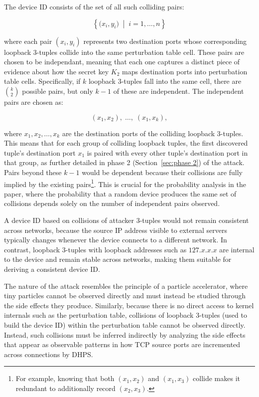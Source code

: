 \documentclass[twocolumn]{report}
\begin{document}
The device ID consists of the set of all such colliding pairs:

\vspace{-0.2cm}
\begin{minipage}{\columnwidth}
	\[
		\left\{ \bigl(x_i, y_i\bigr) \;\middle|\; i = 1, \ldots, n \right\}
	\]
\end{minipage}

where each pair $(x_i, y_i)$ represents \alert{two destination ports} whose corresponding loopback 3-tuples collide into the same perturbation table cell. These pairs are chosen to be \alert{\hypertarget{independant}{independant}}, meaning that each one captures a distinct piece of evidence about how the secret key $K_2$ maps destination ports into perturbation table cells. Specifically, if $k$ loopback 3-tuples fall into the same cell, there are $\binom{k}{2}$ possible pairs, but only $k-1$ of these are independent. The independent pairs are chosen as:

\vspace{-0.2cm}
\begin{minipage}{\columnwidth}
	\[
		(x_1, x_2),\; \ldots,\; (x_1, x_k),
	\]
\end{minipage}

where $x_1, x_2, \ldots, x_k$ are the destination ports of the colliding loopback 3-tuples. This means that for each group of colliding loopback tuples, the first discovered tuple's destination port $x_1$ is paired with every other tuple's destination port in that group, as further detailed in phase 2 (Section~\ref{sec:phase 2}) of the attack. Pairs beyond these $k-1$ would be \alert{dependent} because their collisions are fully implied by the existing pairs\footnote{\tiny For example, knowing that both $(x_1, x_2)$ and $(x_1, x_3)$ collide makes it redundant to additionally record $(x_2, x_3)$.}. This is crucial for the probability analysis in the paper, where the probability that a random device produces the same set of collisions depends solely on the number of independent pairs observed.

A device ID based on collisions of \alert{attacker 3-tuples} would not remain consistent across networks, because the source IP address visible to external servers typically changes whenever the device connects to a different network. In contrast, \alert{loopback 3-tuples} with loopback addresses such as $127.x.x.x$ are internal to the device and remain stable across networks, making them suitable for deriving a consistent device ID.

The nature of the attack resembles the principle of a \alert{particle accelerator}, where tiny particles cannot be observed directly and must instead be studied through the side effects they produce. Similarly, because there is no direct access to kernel internals such as the perturbation table, collisions of loopback 3-tuples (used to build the device ID) within the perturbation table \alert{cannot be observed directly}. Instead, such collisions must be inferred indirectly by analyzing the side effects that appear as observable patterns in how TCP source ports are incremented across connections by DHPS.
\end{document}
